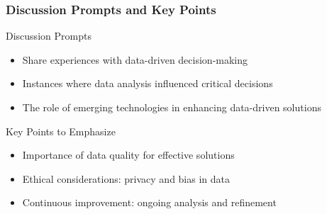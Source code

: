 \documentclass[aspectratio=169]{beamer}
\begin{document}
\begin{frame}[fragile]
    \frametitle{Discussion Prompts and Key Points}
    \begin{block}{Discussion Prompts}
        \begin{itemize}
            \item Share experiences with data-driven decision-making
            \item Instances where data analysis influenced critical decisions
            \item The role of emerging technologies in enhancing data-driven solutions
        \end{itemize}
    \end{block}

    \begin{block}{Key Points to Emphasize}
        \begin{itemize}
            \item Importance of data quality for effective solutions
            \item Ethical considerations: privacy and bias in data
            \item Continuous improvement: ongoing analysis and refinement
        \end{itemize}
    \end{block}
\end{frame}
\end{document}
